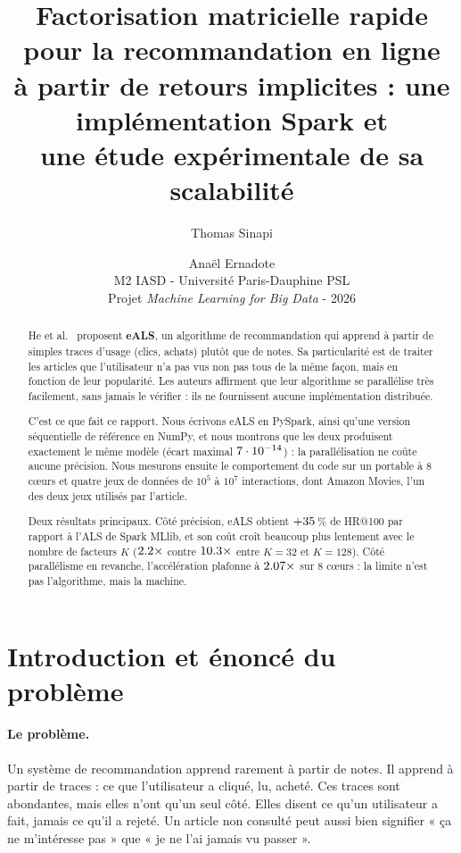 \documentclass[11pt,a4paper]{article}
\title{\vspace{-1.2cm}\textbf{Factorisation matricielle rapide pour la recommandation en ligne\\
à partir de retours implicites : une implémentation Spark et\\ une étude expérimentale de sa scalabilité}}
\author{Thomas Sinapi \and Anaël Ernadote\\[4pt]
\normalsize M2 IASD - Université Paris-Dauphine PSL\\
\normalsize Projet \emph{Machine Learning for Big Data} - 2026}
\date{}
\begin{document}
\maketitle
\vspace{-0.8cm}

\begin{abstract}
\noindent
He et al.~\cite{he2016eals} proposent \textbf{eALS}, un algorithme de recommandation
qui apprend à partir de simples traces d'usage (clics, achats) plutôt que de notes.
Sa particularité est de traiter les articles que l'utilisateur n'a pas vus non pas
tous de la même façon, mais en fonction de leur popularité. Les auteurs affirment que
leur algorithme se parallélise très facilement, sans jamais le vérifier : ils ne
fournissent aucune implémentation distribuée.

C'est ce que fait ce rapport. Nous écrivons eALS en PySpark, ainsi qu'une version
séquentielle de référence en NumPy, et nous montrons que les deux produisent
exactement le même modèle (écart maximal $7\cdot 10^{-14}$) : la parallélisation ne coûte
aucune précision. Nous mesurons ensuite le comportement du code sur un portable à
8 cœurs et quatre jeux de données de $10^5$ à $10^7$ interactions, dont Amazon Movies,
l'un des deux jeux utilisés par l'article.

Deux résultats principaux. Côté précision, eALS obtient $+35$\,\% de HR@100
par rapport à l'ALS de Spark MLlib, et son coût croît beaucoup plus lentement avec le
nombre de facteurs $K$ ($2.2\times$ contre $10.3\times$ entre
$K=32$ et $K=128$). Côté parallélisme en revanche, l'accélération plafonne à
$2.07\times$ sur 8 cœurs : la limite n'est pas l'algorithme, mais la machine.
\end{abstract}

\vspace{0.2cm}
\tableofcontents
\vspace{0.3cm}

\section{Introduction et énoncé du problème}

\paragraph{Le problème.} Un système de recommandation apprend rarement à partir de
notes. Il apprend à partir de traces : ce que l'utilisateur a cliqué, lu, acheté. Ces
traces sont abondantes, mais elles n'ont qu'un seul côté. Elles disent ce qu'un
utilisateur a fait, jamais ce qu'il a rejeté. Un article non consulté peut aussi bien
signifier « ça ne m'intéresse pas » que « je ne l'ai jamais vu passer ».
\end{document}

